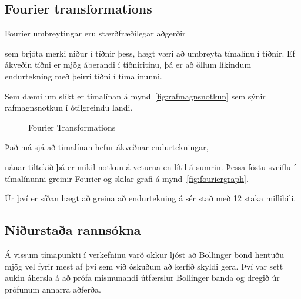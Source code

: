 \documentclass{article}
\begin{document}
\subsection{Fourier transformations} 

Fourier umbreytingar eru stærðfræðilegar aðgerðir

sem brjóta merki niður í tíðnir þess, hægt væri að umbreyta tímalínu í tíðnir. 
Ef ákveðin tíðni er mjög áberandi í tíðniritinu, þá er að öllum líkindum
endurtekning með þeirri tíðni í tímalínunni. 

Sem dæmi um slíkt er tímalínan á mynd~\ref{fig:rafmagnsnotkun} sem sýnir
rafmagnsnotkun í ótilgreindu landi.


\begin{figure}[H]
  \centering 
 
 
  \caption{Fourier Transformations}
  \label{fig:fourier}
\end{figure}

Það má sjá að tímalínan hefur ákveðnar endurtekningar,

nánar tiltekið þá er mikil notkun á veturna en lítil á sumrin.
Þessa föstu sveiflu í tímalínunni greinir Fourier og skilar grafi á mynd~\ref{fig:fouriergraph}. 

Úr því er síðan hægt að greina að endurtekning á sér stað með 12 staka
millibili.

\subsection{Niðurstaða rannsókna}
Á vissum tímapunkti í verkefninu varð okkur ljóst að Bollinger bönd hentuðu
mjög vel fyrir mest af því sem við óskuðum að kerfið skyldi gera.
Því var sett aukin áhersla á að prófa mismunandi útfærslur Bollinger banda og
dregið úr prófunum annarra aðferða.
\end{document}
